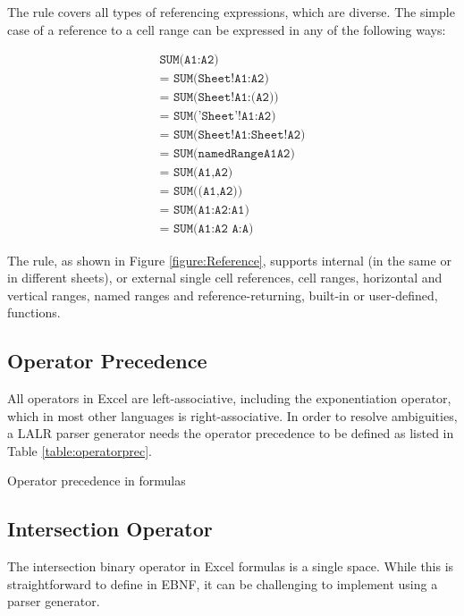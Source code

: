 \documentclass[times]{smrauth}
\begin{document}
The  rule covers all types of referencing expressions, which are diverse. The simple case of a reference to a cell range can be expressed in any of the following ways:

\begin{align}
	\texttt{SUM(A1:A2)} \\ 
	\texttt{= SUM(Sheet!A1:A2)} \\
	\texttt{= SUM(Sheet!A1:(A2))} \\
	\texttt{= SUM('Sheet'!A1:A2)} \\
	\texttt{= SUM(Sheet!A1:Sheet!A2)} \\
	\texttt{= SUM(namedRangeA1A2)} \\ 
	\texttt{= SUM(A1,A2)} \\ 
	\texttt{= SUM((A1,A2))} \\ 
	\texttt{= SUM(A1:A2:A1)} \\
	\texttt{= SUM(A1:A2 A:A)} 
\end{align}

The  rule, as shown in Figure \ref{figure:Reference}, supports internal (in the same or in different sheets), or external single cell references, cell ranges, horizontal and vertical ranges, named ranges and reference-returning, built-in or user-defined, functions.

\subsection{Operator Precedence}
\label{sec:operatorprecedence}

All operators in Excel are left-associative, including the exponentiation operator, which in most other languages is right-associative.
In order to resolve ambiguities, a LALR parser generator needs the operator precedence to be defined as listed in Table \ref{table:operatorprec}.

\begin{table}[]
	\centering
	\caption{Operator precedence in formulas}
	\label{table:operatorprec}
	
\end{table}

\subsection{Intersection Operator}

The intersection binary operator in Excel formulas is a single space.
While this is straightforward to define in EBNF, it can be challenging to implement using a parser generator.
\end{document}
